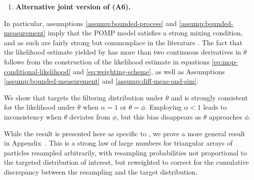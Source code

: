 \begin{enumerate}[label=(A\arabic*),itemsep=-1ex, , font=\small]
\item[(A6-J)]{\textbf{Alternative joint version of (A6).}} 
\end{enumerate}


In particular, assumptions \ref{assump:bounded-process} and \ref{assump:bounded-measurement} imply that the POMP model satisfies a strong mixing condition, and as such are fairly strong but commonplace in the literature \citep{karjalainen23, delMoral04}. The fact that the likelihood estimate yielded by  has more than two continuous derivatives in $\theta$ follows from the construction of the likelihood estimate in equations \ref{eq:mop-conditional-likelihood} and \ref{eq:weighting-scheme}, as well as Assumptions \ref{assump:bounded-measurement} and \ref{assump:diff-meas-and-sim}. 


We show that  targets the filtering distribution under $\theta$ and is strongly consistent for the likelihood under $\theta$ when $\alpha=1$ or $\theta=\phi$.
Employing $\alpha<1$ leads to inconsistency when $\theta$ deviates from $\phi$, but this bias disappears as $\theta$ approaches $\phi$.

While the result is presented here as specific to , we prove a more general result in Appendix~\suppSecProofTriangularArrays.
This is a strong law of large numbers for triangular arrays of particles resampled arbitrarily, with resampling probabilities not proportional to the targeted distribution of interest, but reweighted to correct for the cumulative discrepancy between the resampling and the target distribution.


